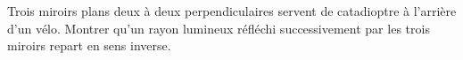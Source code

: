 Trois miroirs plans deux à deux perpendiculaires servent de catadioptre à l'arrière d'un vélo. Montrer qu'un rayon lumineux réfléchi successivement par les trois miroirs repart en sens inverse.
